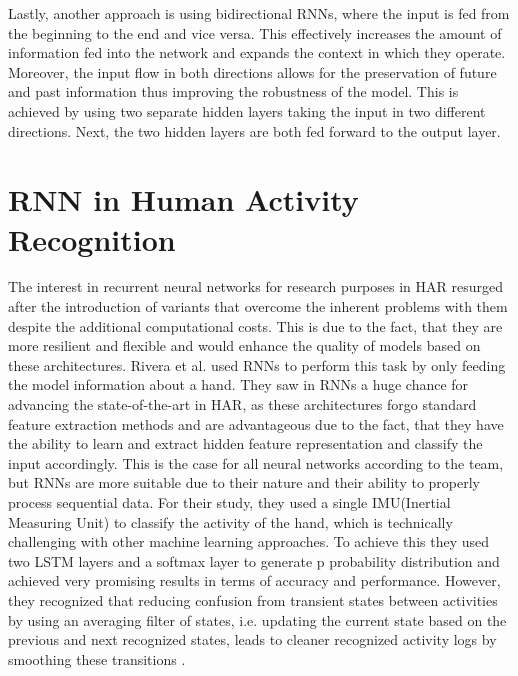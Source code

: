Lastly, another approach is using bidirectional RNNs, where the input is fed from the beginning to the end and vice versa. This effectively increases the amount of information fed into the network and expands the context in which they operate. Moreover, the input flow in both directions allows for the preservation of future and past information thus improving the robustness of the model. This is achieved by using two separate hidden layers taking the input in two different directions. Next, the two hidden layers are both fed forward to the output layer\cite{graves2013hybrid}.
\section{RNN in Human Activity Recognition}
The interest in recurrent neural networks for research purposes in HAR resurged after the introduction of variants that overcome the inherent problems with them despite the additional computational costs. This is due to the fact, that they are more resilient and flexible and would enhance the quality of models based on these architectures. Rivera et al. used RNNs to perform this task by only feeding the model information about a hand. They saw in RNNs a huge chance for advancing the state-of-the-art in HAR, as these architectures forgo standard feature extraction methods and are advantageous due to the fact, that they have the ability to learn and extract hidden feature representation and classify the input accordingly. This is the case for all neural networks according to the team, but RNNs are more suitable due to their nature and their ability to properly process sequential data. For their study, they used a single IMU(Inertial Measuring Unit) to classify the activity of the hand, which is technically challenging with other machine learning approaches. To achieve this they used two LSTM layers and a softmax layer to generate p probability distribution and achieved very promising results in terms of accuracy and performance. However, they recognized that reducing confusion from transient states between activities by using an averaging filter of states, i.e. updating the current state based on the previous and next recognized states, leads to cleaner recognized activity logs by smoothing these transitions \cite{rivera2017recognition}.\newline 
